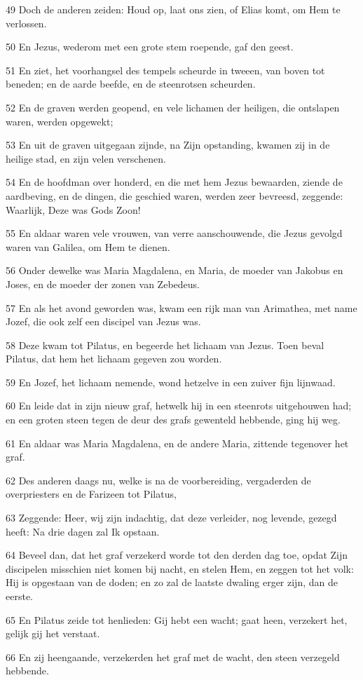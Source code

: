 \par 49 Doch de anderen zeiden: Houd op, laat ons zien, of Elias komt, om Hem te verlossen.
\par 50 En Jezus, wederom met een grote stem roepende, gaf den geest.
\par 51 En ziet, het voorhangsel des tempels scheurde in tweeen, van boven tot beneden; en de aarde beefde, en de steenrotsen scheurden.
\par 52 En de graven werden geopend, en vele lichamen der heiligen, die ontslapen waren, werden opgewekt;
\par 53 En uit de graven uitgegaan zijnde, na Zijn opstanding, kwamen zij in de heilige stad, en zijn velen verschenen.
\par 54 En de hoofdman over honderd, en die met hem Jezus bewaarden, ziende de aardbeving, en de dingen, die geschied waren, werden zeer bevreesd, zeggende: Waarlijk, Deze was Gods Zoon!
\par 55 En aldaar waren vele vrouwen, van verre aanschouwende, die Jezus gevolgd waren van Galilea, om Hem te dienen.
\par 56 Onder dewelke was Maria Magdalena, en Maria, de moeder van Jakobus en Joses, en de moeder der zonen van Zebedeus.
\par 57 En als het avond geworden was, kwam een rijk man van Arimathea, met name Jozef, die ook zelf een discipel van Jezus was.
\par 58 Deze kwam tot Pilatus, en begeerde het lichaam van Jezus. Toen beval Pilatus, dat hem het lichaam gegeven zou worden.
\par 59 En Jozef, het lichaam nemende, wond hetzelve in een zuiver fijn lijnwaad.
\par 60 En leide dat in zijn nieuw graf, hetwelk hij in een steenrots uitgehouwen had; en een groten steen tegen de deur des grafs gewenteld hebbende, ging hij weg.
\par 61 En aldaar was Maria Magdalena, en de andere Maria, zittende tegenover het graf.
\par 62 Des anderen daags nu, welke is na de voorbereiding, vergaderden de overpriesters en de Farizeen tot Pilatus,
\par 63 Zeggende: Heer, wij zijn indachtig, dat deze verleider, nog levende, gezegd heeft: Na drie dagen zal Ik opstaan.
\par 64 Beveel dan, dat het graf verzekerd worde tot den derden dag toe, opdat Zijn discipelen misschien niet komen bij nacht, en stelen Hem, en zeggen tot het volk: Hij is opgestaan van de doden; en zo zal de laatste dwaling erger zijn, dan de eerste.
\par 65 En Pilatus zeide tot henlieden: Gij hebt een wacht; gaat heen, verzekert het, gelijk gij het verstaat.
\par 66 En zij heengaande, verzekerden het graf met de wacht, den steen verzegeld hebbende.

